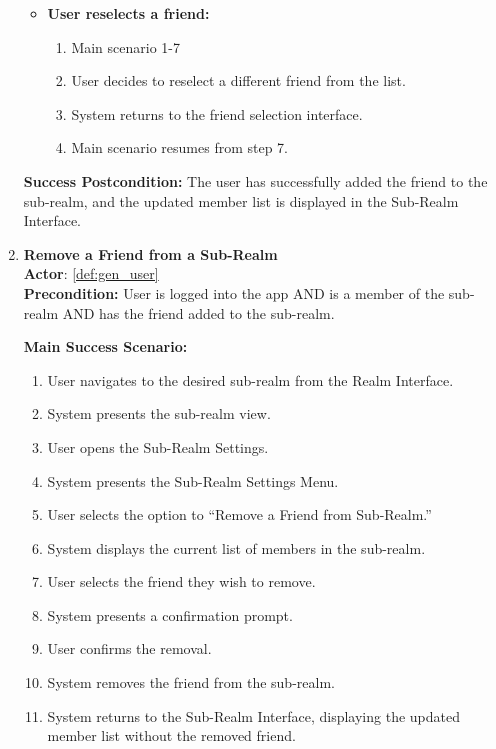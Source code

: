 \documentclass{article}
\begin{document}
\begin{enumerate}[label=\textbf{UC\arabic*}]
\begin{itemize}
            \item[{}] \textbf{User reselects a friend:}
            \begin{enumerate}[label=\textbf{\arabic*.}]
                \item Main scenario 1-7
                \item User decides to reselect a different friend from the list.
                \item System returns to the friend selection interface.
                \item Main scenario resumes from step 7.
            \end{enumerate}
        \end{itemize}
        
        \textbf{Success Postcondition:} The user has successfully added the friend to the sub-realm, and the updated member list is displayed in the Sub-Realm Interface.

    \item \label{uc:22} \textbf{Remove a Friend from a Sub-Realm} \\
        \textbf{Actor}: \ref{def:gen_user} \\
        \textbf{Precondition:} User is logged into the app AND is a member of the sub-realm AND has the friend added to the sub-realm.
    
        \textbf{Main Success Scenario:}
        \begin{enumerate}[label=\textbf{\arabic*.}]
            \item User navigates to the desired sub-realm from the Realm Interface.
            \item System presents the sub-realm view.
            \item User opens the Sub-Realm Settings.
            \item System presents the Sub-Realm Settings Menu.
            \item User selects the option to “Remove a Friend from Sub-Realm.”
            \item System displays the current list of members in the sub-realm.
            \item User selects the friend they wish to remove.
            \item System presents a confirmation prompt.
            \item User confirms the removal.
            \item System removes the friend from the sub-realm.
            \item System returns to the Sub-Realm Interface, displaying the updated member list without the removed friend.
        \end{enumerate}
        

\end{enumerate}
\end{document}
